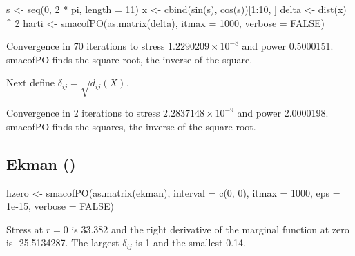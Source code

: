 \documentclass[
  12pt,
  letterpaper,
  DIV=11,
  numbers=noendperiod]{scrartcl}
\newenvironment{Shaded}{\begin{snugshade}}{\end{snugshade}}
\newcommand{\AttributeTok}[1]{\textcolor[rgb]{0.40,0.45,0.13}{#1}}
\newcommand{\ConstantTok}[1]{\textcolor[rgb]{0.56,0.35,0.01}{#1}}
\newcommand{\DecValTok}[1]{\textcolor[rgb]{0.68,0.00,0.00}{#1}}
\newcommand{\FloatTok}[1]{\textcolor[rgb]{0.68,0.00,0.00}{#1}}
\newcommand{\FunctionTok}[1]{\textcolor[rgb]{0.28,0.35,0.67}{#1}}
\newcommand{\NormalTok}[1]{\textcolor[rgb]{0.00,0.23,0.31}{#1}}
\newcommand{\OtherTok}[1]{\textcolor[rgb]{0.00,0.23,0.31}{#1}}
\newcommand{\SpecialCharTok}[1]{\textcolor[rgb]{0.37,0.37,0.37}{#1}}
\begin{document}
\begin{Shaded}
\begin{Highlighting}[]
\NormalTok{s }\OtherTok{\textless{}{-}} \FunctionTok{seq}\NormalTok{(}\DecValTok{0}\NormalTok{, }\DecValTok{2} \SpecialCharTok{*}\NormalTok{ pi, }\AttributeTok{length =} \DecValTok{11}\NormalTok{)}
\NormalTok{x }\OtherTok{\textless{}{-}} \FunctionTok{cbind}\NormalTok{(}\FunctionTok{sin}\NormalTok{(s), }\FunctionTok{cos}\NormalTok{(s))[}\DecValTok{1}\SpecialCharTok{:}\DecValTok{10}\NormalTok{, ]}
\NormalTok{delta }\OtherTok{\textless{}{-}} \FunctionTok{dist}\NormalTok{(x) }\SpecialCharTok{\^{}} \DecValTok{2}
\NormalTok{harti }\OtherTok{\textless{}{-}} \FunctionTok{smacofPO}\NormalTok{(}\FunctionTok{as.matrix}\NormalTok{(delta), }\AttributeTok{itmax =} \DecValTok{1000}\NormalTok{, }\AttributeTok{verbose =} \ConstantTok{FALSE}\NormalTok{)}
\end{Highlighting}
\end{Shaded}

Convergence in 70 iterations to stress
\ensuremath{1.2290209\times 10^{-8}} and power 0.5000151. smacofPO finds
the square root, the inverse of the square.

Next define \(\delta_{ij}=\sqrt{d_{ij}(X)}\).

Convergence in 2 iterations to stress
\ensuremath{2.2837148\times 10^{-9}} and power 2.0000198. smacofPO finds
the squares, the inverse of the square root.

\subsection{\texorpdfstring{Ekman
()}{Ekman (1954)}}\label{ekman_54}

\begin{Shaded}
\begin{Highlighting}[]
\NormalTok{hzero }\OtherTok{\textless{}{-}} \FunctionTok{smacofPO}\NormalTok{(}\FunctionTok{as.matrix}\NormalTok{(ekman), }\AttributeTok{interval =} \FunctionTok{c}\NormalTok{(}\DecValTok{0}\NormalTok{, }\DecValTok{0}\NormalTok{), }\AttributeTok{itmax =} \DecValTok{1000}\NormalTok{, }\AttributeTok{eps =} \FloatTok{1e{-}15}\NormalTok{, }\AttributeTok{verbose =} \ConstantTok{FALSE}\NormalTok{)}
\end{Highlighting}
\end{Shaded}

Stress at \(r=0\) is 33.382 and the right derivative of the marginal
function at zero is -25.5134287. The largest \(\delta_{ij}\) is 1 and
the smallest 0.14.
\end{document}
